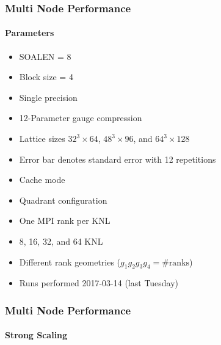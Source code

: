 \documentclass{beamer}
\begin{document}
  \begin{frame}
      \frametitle{Multi Node Performance}
      \framesubtitle{Parameters}

      \begin{itemize}
          \item SOALEN = 8
          \item Block size = 4
          \item Single precision
          \item 12-Parameter gauge compression
          \item Lattice sizes $32^3 \times 64$, $48^3 \times 96$, and $64^3 \times 128$
          \item Error bar denotes standard error with 12 repetitions
      \end{itemize}

      \begin{itemize}
          \item Cache mode
          \item Quadrant configuration
          \item One MPI rank per KNL
          \item 8, 16, 32, and 64 KNL
          \item Different rank geometries ($g_1 g_2 g_3 g_4 = \text{\# ranks}$)
          \item Runs performed 2017-03-14 (last Tuesday)
      \end{itemize}
      
  \end{frame}

  \begin{frame}
      \frametitle{Multi Node Performance}
      \framesubtitle{Strong Scaling}

      \centering
  \end{frame}
\end{document}
